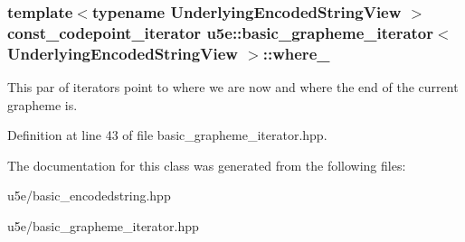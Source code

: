 \subsubsection[{\texorpdfstring{where\+\_\+}{where_}}]{\setlength{\rightskip}{0pt plus 5cm}template$<$typename Underlying\+Encoded\+String\+View $>$ {\bf const\+\_\+codepoint\+\_\+iterator} {\bf u5e\+::basic\+\_\+grapheme\+\_\+iterator}$<$ Underlying\+Encoded\+String\+View $>$\+::where\+\_\+}\hypertarget{classu5e_1_1basic__grapheme__iterator_ad83406ade7728eeb7ad5b8344c44156f}{}\label{classu5e_1_1basic__grapheme__iterator_ad83406ade7728eeb7ad5b8344c44156f}
This par of iterators point to where we are now and where the end of the current grapheme is. 

Definition at line 43 of file basic\+\_\+grapheme\+\_\+iterator.\+hpp.



The documentation for this class was generated from the following files\+:\begin{DoxyCompactItemize}
\item 
u5e/basic\+\_\+encodedstring.\+hpp\item 
u5e/basic\+\_\+grapheme\+\_\+iterator.\+hpp\end{DoxyCompactItemize}
